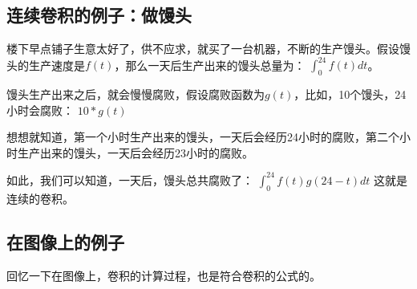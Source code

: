 \documentclass[12pt]{article}
\begin{document}
\subsection{连续卷积的例子：做馒头}
楼下早点铺子生意太好了，供不应求，就买了一台机器，不断的生产馒头。假设馒头的生产速度是$f(t)$，那么一天后生产出来的馒头总量为：
$\int_{0}^{24}f(t)dt$。

馒头生产出来之后，就会慢慢腐败，假设腐败函数为$g(t)$，比如，10个馒头，24小时会腐败：
$10*g(t)$

想想就知道，第一个小时生产出来的馒头，一天后会经历24小时的腐败，第二个小时生产出来的馒头，一天后会经历23小时的腐败。

如此，我们可以知道，一天后，馒头总共腐败了：
$\int_{0}^{24}f(t)g(24-t)dt$
这就是连续的卷积。

\subsection{在图像上的例子}
回忆一下在图像上，卷积的计算过程，也是符合卷积的公式的。



\end{document}
